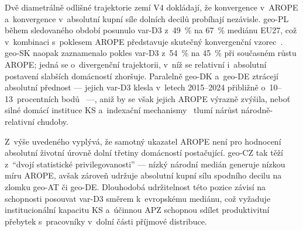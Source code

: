 Dvě diametrálně odlišné trajektorie zemí \ac{V4} dokládají, že konvergence v~\ac{AROPE} a~konvergence v~absolutní kupní síle dolních decilů probíhají nezávisle.
\Acl{geo-PL} během sledovaného období posunulo \acs{var-D3} z~\SI{49}{\percent} na \SI{67}{\percent} mediánu \ac{EU}27, což v~kombinaci s~poklesem \ac{AROPE} představuje skutečný konvergenční vzorec~\cite{eurostat_ilc_di01_D3_PPS,eurostat_ilc_peps01n_PC_pop}.
\Acl{geo-SK} naopak zaznamenalo pokles \acs{var-D3} z~\SI{54}{\percent} na \SI{45}{\percent} při současném růstu \ac{AROPE}; jedná se o~divergenční trajektorii, v~níž se relativní i~absolutní postavení slabších domácností zhoršuje.
Paralelně \acs{geo-DK} a~\acs{geo-DE} ztrácejí absolutní přednost --- jejich \acs{var-D3} klesla v~letech 2015--2024 přibližně o~\numrange{10}{13}~procentních bodů~\cite{eurostat_ilc_di01_D3_PPS} ---, aniž by se však jejich \ac{AROPE} výrazně zvýšila, neboť silné domácí instituce \ac{KS} a~indexační mechanismy~\cite{etui_cba} tlumí nárůst národně-relativní chudoby.

Z~výše uvedeného vyplývá, že samotný ukazatel \ac{AROPE} není pro hodnocení absolutní životní úrovně dolní třetiny domácností postačující.
\Acl{geo-CZ} tak těží z~\enquote{dvojí statistické privilegovanosti} --- nízký národní medián generuje nízkou míru \ac{AROPE}, avšak zároveň udržuje absolutní kupní sílu spodního decilu na zlomku \acs{geo-AT} či \acs{geo-DE}.
Dlouhodobá udržitelnost této pozice závisí na schopnosti posouvat \acs{var-D3} směrem k~evropskému mediánu, což vyžaduje institucionální kapacitu \ac{KS} a~účinnou \ac{APZ} schopnou sdílet produktivitní přebytek s~pracovníky v~dolní části příjmové distribuce.



